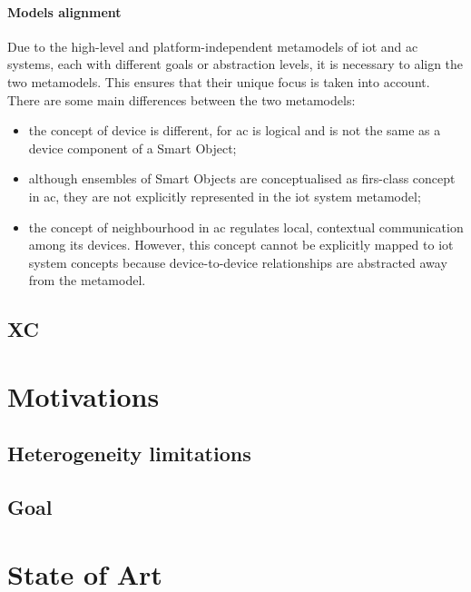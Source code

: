 \paragraph{Models alignment}
Due to the high-level and platform-independent metamodels of \ac{iot} and \ac{ac} systems, each with different goals or
abstraction levels, it is necessary to align the two metamodels.
This ensures that their unique focus is taken into account.
There are some main differences between the two metamodels:
\begin{itemize}
    \item the concept of device is different, for \ac{ac} is logical and is not the same as a device component of a Smart Object;
    \item although ensembles of Smart Objects are conceptualised as firs-class concept in \ac{ac}, they are not explicitly
        represented in the \ac{iot} system metamodel;
    \item the concept of neighbourhood in \ac{ac} regulates local, contextual communication among its devices.
        However, this concept cannot be explicitly mapped to \ac{iot} system concepts because device-to-device relationships
        are abstracted away from the metamodel.
\end{itemize}


\subsection{XC}
\label{subsec:xc}


\section{Motivations}
\label{sec:motivations}


\subsection{Heterogeneity limitations}
\label{subsec:heterogeneity-limitations}

\subsection{Goal}
\label{subsec:goal}


\section{State of Art}
\label{sec:state-of-art}

